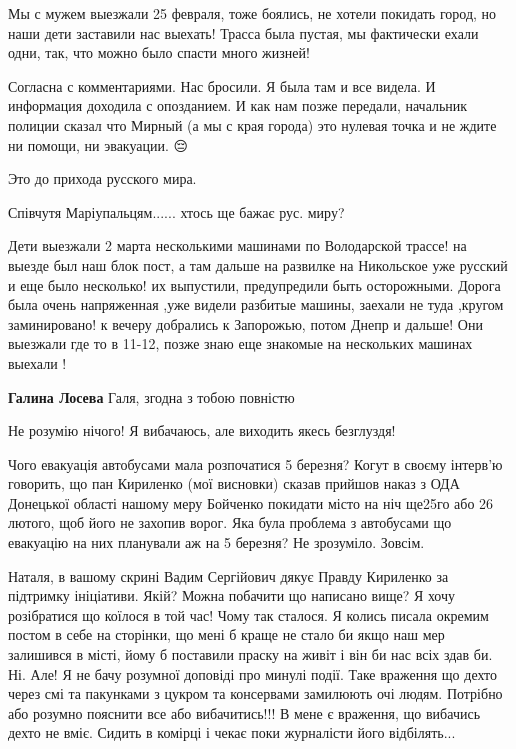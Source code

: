 
Мы с мужем выезжали 25 февраля, тоже боялись, не хотели покидать город, но наши
дети заставили нас выехать! Трасса была пустая, мы фактически ехали одни, так,
что можно было спасти много жизней!


Согласна с комментариями. Нас бросили. Я была там и все видела. И информация
доходила с опозданием. И как нам позже передали, начальник полиции сказал что
Мирный (а мы с края города) это нулевая точка и не ждите ни помощи, ни
эвакуации. 😔

Это до прихода русского мира.


Співчутя Маріупальцям...... хтось ще бажає рус. миру?


Дети выезжали 2 марта несколькими машинами по Володарской трассе! на выезде был
наш блок пост, а там дальше на развилке на Никольское уже русский и еще было
несколько! их выпустили, предупредили быть осторожными. Дорога была очень
напряженная ,уже видели разбитые машины, заехали не туда ,кругом заминировано! к
вечеру добрались к Запорожью, потом Днепр и дальше! Они выезжали где то в
11-12, позже знаю еще знакомые на нескольких машинах выехали !

\textbf{Галина Лосева} Галя, згодна з тобою повністю


Не розумію нічого! Я вибачаюсь, але виходить якесь безглуздя!

Чого евакуація автобусами мала розпочатися 5 березня? Когут в своєму інтерв'ю
говорить, що пан Кириленко (мої висновки) сказав прийшов наказ з ОДА Донецької
області нашому меру Бойченко покидати місто на ніч ще25го або 26 лютого, щоб
його не захопив ворог. Яка була проблема з автобусами що евакуацію на них
планували аж на 5 березня? Не зрозуміло. Зовсім.

Наталя, в вашому скрині Вадим Сергійович дякує Правду Кириленко за підтримку
ініціативи. Якій? Можна побачити що написано вище? Я хочу розібратися що коїлося
в той час! Чому так сталося. Я колись писала окремим постом в себе на сторінки, що
мені б краще не стало би якщо наш мер залишився в місті, йому б поставили праску
на живіт і він би нас всіх здав би. Ні. Але! Я не бачу розумної доповіді про
минулі події. Таке враження що дехто через смі та пакунками з цукром та
консервами замилюють очі людям. Потрібно або розумно пояснити все або
вибачитись!!! В мене є враження, що вибачись дехто не вміє. Сидить в комірці і
чекає поки журналісти його відбілять...

